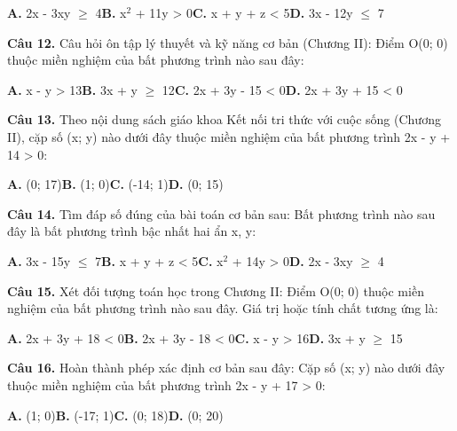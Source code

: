\documentclass[11pt,a4paper]{article}
\begin{document}
\hspace*{1.5em}\textbf{A.} 2x - 3xy $\ge$ 4\quad\quad \textbf{B.} x$^2$ + 11y > 0\quad\quad \textbf{C.} x + y + z < 5\quad\quad \textbf{D.} 3x - 12y $\le$ 7\par\vspace{2pt}
\textbf{\color{primary} Câu 12.} Câu hỏi ôn tập lý thuyết và kỹ năng cơ bản (Chương II): Điểm O(0; 0) thuộc miền nghiệm của bất phương trình nào sau đây:\par
\hspace*{1.5em}\textbf{A.} x - y > 13\quad\quad \textbf{B.} 3x + y $\ge$ 12\quad\quad \textbf{C.} 2x + 3y - 15 < 0\quad\quad \textbf{D.} 2x + 3y + 15 < 0\par\vspace{2pt}
\textbf{\color{primary} Câu 13.} Theo nội dung sách giáo khoa Kết nối tri thức với cuộc sống (Chương II), cặp số (x; y) nào dưới đây thuộc miền nghiệm của bất phương trình 2x - y + 14 > 0:\par
\hspace*{1.5em}\textbf{A.} (0; 17)\quad\quad \textbf{B.} (1; 0)\quad\quad \textbf{C.} (-14; 1)\quad\quad \textbf{D.} (0; 15)\par\vspace{2pt}
\textbf{\color{primary} Câu 14.} Tìm đáp số đúng của bài toán cơ bản sau: Bất phương trình nào sau đây là bất phương trình bậc nhất hai ẩn x, y:\par
\hspace*{1.5em}\textbf{A.} 3x - 15y $\le$ 7\quad\quad \textbf{B.} x + y + z < 5\quad\quad \textbf{C.} x$^2$ + 14y > 0\quad\quad \textbf{D.} 2x - 3xy $\ge$ 4\par\vspace{2pt}
\textbf{\color{primary} Câu 15.} Xét đối tượng toán học trong Chương II: Điểm O(0; 0) thuộc miền nghiệm của bất phương trình nào sau đây. Giá trị hoặc tính chất tương ứng là:\par
\hspace*{1.5em}\textbf{A.} 2x + 3y + 18 < 0\quad\quad \textbf{B.} 2x + 3y - 18 < 0\quad\quad \textbf{C.} x - y > 16\quad\quad \textbf{D.} 3x + y $\ge$ 15\par\vspace{2pt}
\textbf{\color{primary} Câu 16.} Hoàn thành phép xác định cơ bản sau đây: Cặp số (x; y) nào dưới đây thuộc miền nghiệm của bất phương trình 2x - y + 17 > 0:\par
\hspace*{1.5em}\textbf{A.} (1; 0)\quad\quad \textbf{B.} (-17; 1)\quad\quad \textbf{C.} (0; 18)\quad\quad \textbf{D.} (0; 20)\par\vspace{2pt}
\end{document}
